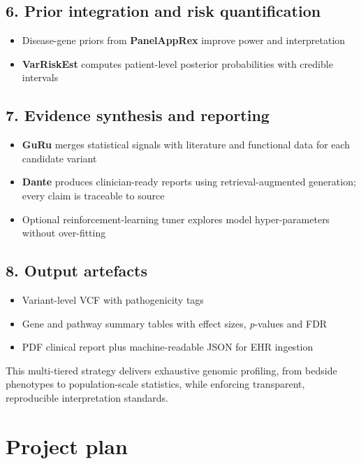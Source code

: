 \subsection*{6. Prior integration and risk quantification}
\begin{itemize}
  \item Disease-gene priors from \textbf{PanelAppRex} improve power and interpretation \cite{Lawless2025PanelAppRex}  
  \item \textbf{VarRiskEst} computes patient-level posterior probabilities with credible intervals \cite{Lawless2025Quantitative}
\end{itemize}

\subsection*{7. Evidence synthesis and reporting}
\begin{itemize}
  \item \textbf{GuRu} merges statistical signals with literature and functional data for each candidate variant \cite{Lawless2025GuRu}  
  \item \textbf{Dante} produces clinician-ready reports using retrieval-augmented generation; every claim is traceable to source  
  \item Optional reinforcement-learning tuner \cite{Lawless2025Actor} explores model hyper-parameters without over-fitting
\end{itemize}

\subsection*{8. Output artefacts}
\begin{itemize}
  \item Variant-level VCF with pathogenicity tags  
  \item Gene and pathway summary tables with effect sizes, \textit{p}-values and FDR  
  \item PDF clinical report plus machine-readable JSON for EHR ingestion
\end{itemize}

This multi-tiered strategy delivers exhaustive genomic profiling, from bedside phenotypes to population-scale statistics, while enforcing transparent, reproducible interpretation standards.




\section*{Project plan}

